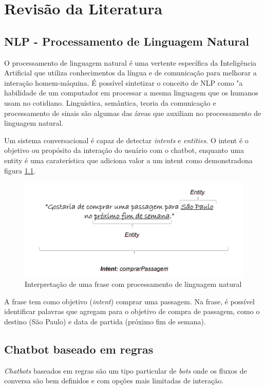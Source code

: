   \chapter{Revisão da Literatura}
  
  \section{NLP - Processamento de Linguagem Natural}
  O processamento de linguagem natural é uma vertente específica da Inteligência Artificial que utiliza conhecimentos da língua e de comunicação para melhorar a interação homem-máquina. É possível sintetizar o conceito de NLP como "a habilidade de um computador em processar a mesma linguagem que os humanos usam no cotidiano\cite{chatbot_definition}. Linguística, semântica, teoria da comunicação e processamento de sinais são algumas das áreas que auxiliam no processamento de linguagem natural.
  
  Um sistema conversacional é capaz de detectar \textit{intents} e \textit{entities}. O intent é o objetivo ou propósito da interação do usuário com o chatbot, enquanto uma entity é uma caraterística que adiciona valor a um intent\cite{jain2018convey} como demonstradona figura \ref{fig:nlp}.
  
  \begin{figure}[h!]
  	\begin{center}
  		\includegraphics[width=0.95\linewidth]{images/nlp.png}
  		\caption{Interpretação de uma frase com processamento de linguagem natural}
  		\label{fig:nlp}
  	\end{center}
  \end{figure}
  
  A frase tem como objetivo (\textit{intent}) comprar uma passagem. Na frase, é possível identificar palavras que agregam para o objetivo de compra de passagem, como o destino (São Paulo) e data de partida (próximo fim de semana).
  
  \section{Chatbot baseado em regras}
  \textit{Chatbots} baseados em regras são um tipo particular de \textit{bots} onde os fluxos de conversa são bem definidos e com opções mais limitadas de interação.
  
